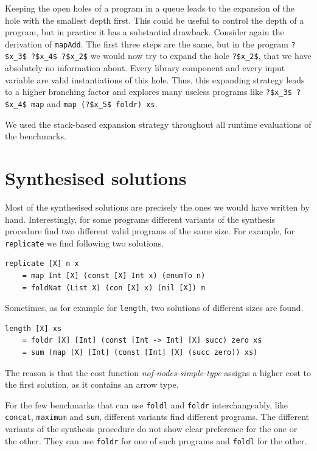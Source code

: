 Keeping the open holes of a program in a queue leads to the expansion of the hole with the smallest depth first. This could be useful to control the depth of a program, but in practice it has a substantial drawback. Consider again the derivation of \lstinline?mapAdd?. The first three steps are the same, but in the program \lstinline!?$x_3$ ?$x_4$ ?$x_2$! we would now try to expand the hole \lstinline!?$x_2$!, that we have absolutely no information about. Every library component and every input variable are valid instantiations of this hole. Thus, this expanding strategy leads to a higher branching factor and explores many useless programs like \lstinline!?$x_3$ ?$x_4$ map! and \lstinline!map (?$x_5$ foldr) xs!.

We used the stack-based expansion strategy throughout all runtime evaluations of the benchmarks.

\section{Synthesised solutions}
Most of the synthesised solutions are precisely the ones we would have written by hand. Interestingly, for some programs different variants of the synthesis procedure find two different valid programs of the same size. For example, for \lstinline?replicate? we find following two solutions.
\begin{lstlisting}
replicate [X] n x
    = map Int [X] (const [X] Int x) (enumTo n)
    = foldNat (List X) (con [X] x) (nil [X]) n
\end{lstlisting}


Sometimes, as for example for \lstinline?length?, two solutions of different sizes are found.
\begin{lstlisting}
length [X] xs
    = foldr [X] [Int] (const [Int -> Int] [X] succ) zero xs
    = sum (map [X] [Int] (const [Int] [X] (succ zero)) xs)
\end{lstlisting}
 The reason is that the cost function \textit{nof-nodes-simple-type} assigns a higher cost to the first solution, as it contains an arrow type.

For the few benchmarks that can use \lstinline?foldl? and \lstinline?foldr? interchangeably, like \lstinline?concat?, \lstinline?maximum? and \lstinline?sum?, different variants find different programs. The different variants of the synthesis procedure do not show clear preference for the one or the other. They can use \lstinline?foldr? for one of such programs and \lstinline?foldl? for the other.

